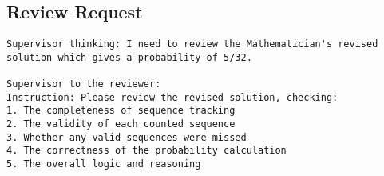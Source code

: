 \subsection{Review Request}
\vspace{-0.5em}
\begin{supervisorbox}
\begin{lstlisting}
Supervisor thinking: I need to review the Mathematician's revised solution which gives a probability of 5/32.

Supervisor to the reviewer:
Instruction: Please review the revised solution, checking:
1. The completeness of sequence tracking
2. The validity of each counted sequence
3. Whether any valid sequences were missed
4. The correctness of the probability calculation
5. The overall logic and reasoning

\end{lstlisting}
\end{supervisorbox}

